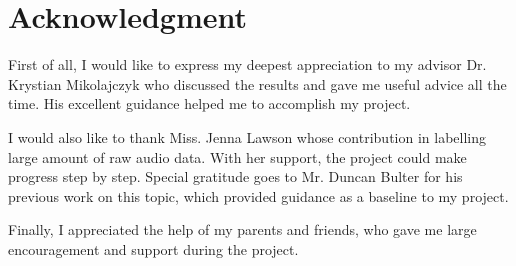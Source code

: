 
\renewcommand{\baselinestretch}{1.5}
\chapter{Acknowledgment}
\renewcommand{\baselinestretch}{\mystretch}


First of all, I would like to express my deepest appreciation to my advisor Dr. Krystian Mikolajczyk who discussed the results and gave me useful advice all the time. His excellent guidance helped me to accomplish my project.\par
I would also like to thank Miss. Jenna Lawson whose contribution in labelling large amount of raw audio data. With her support, the project could make progress step by step. Special gratitude goes to Mr. Duncan Bulter for his previous work on this topic, which provided guidance as a baseline to my project. \par
Finally, I appreciated the help of my parents and friends, who gave me large encouragement and support during the project.





